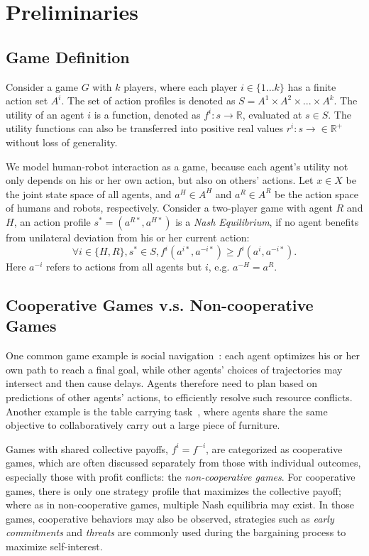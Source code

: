 \documentclass[letterpaper, 10 pt, conference]{ieeeconf}  %
\begin{document}
\section{Preliminaries}
\subsection{Game Definition}
Consider a game $G$ with $k$ players, where each player $i \in \{1...k\}$ has a finite action set $A^i$. The set of action profiles is denoted as $S = A^1 \times A^2 \times ... \times A^k$. The utility of an agent $i$ is a function, denoted as $f^i: s \rightarrow \mathbb{R} $, evaluated at $s \in S$. The utility functions can also be transferred into positive real values $r^i: s \rightarrow \in \mathbb{R}^+$ without loss of generality. 

We model human-robot interaction as a game, because each agent's utility not only depends on his or her own action, but also on others' actions. Let $x \in X$ be the joint state space of all agents, and $a^H \in A^H$ and $a^R \in A^R$ be the action space of humans and robots, respectively. Consider a two-player game with agent $R$ and $H$, an action profile $s^* = (a^{R*},a^{H*})$ is a \textit{Nash Equilibrium}, if no agent benefits from unilateral deviation from his or her current action:
\begin{equation}
    \forall i \in \{H,R\}, s^* \in S, f^i(a^{i*},a^{-i*}) \geq f^i(a^{i},a^{-i*}). 
\end{equation}
Here $a^{-i}$ refers to actions from all agents but $i$, e.g. $a^{-H} = a^R$. 


\subsection{Cooperative Games v.s. Non-cooperative Games}
One common game example is social navigation~\cite{mavrogiannis2016decentralized}: each agent optimizes his or her own path to reach a final goal, while other agents' choices of trajectories may intersect and then cause delays. Agents therefore need to plan based on predictions of other agents' actions, to efficiently resolve such resource conflicts.  Another example is the table carrying task~\cite{nikolaidis2016formalizing}, where agents share the same objective to collaboratively carry out a large piece of furniture.

Games with shared collective payoffs, $f^i=f^{-i}$, are categorized as cooperative games, which are often discussed separately from those with individual outcomes, especially those with profit conflicts: the \textit{non-cooperative games}. For cooperative games, there is only one strategy profile that maximizes the collective payoff; where as in non-cooperative games, multiple Nash equilibria may exist. In those games, cooperative behaviors may also be observed, strategies such as \textit{early commitments} and \textit{threats} are commonly used during the bargaining process to maximize self-interest.
\end{document}
